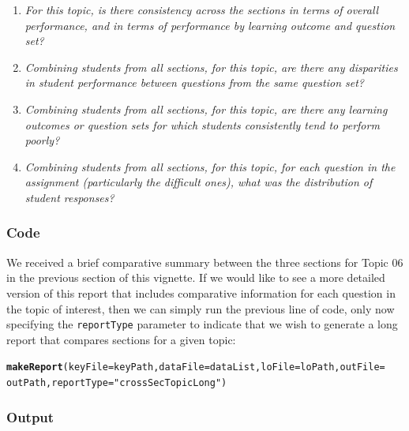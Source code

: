 \documentclass{article}\usepackage[]{graphicx}\usepackage[]{color}
\makeatletter
\newcommand{\hlstr}[1]{\textcolor[rgb]{0.192,0.494,0.8}{#1}}%
\newcommand{\hlstd}[1]{\textcolor[rgb]{0.345,0.345,0.345}{#1}}%
\newcommand{\hlkwc}[1]{\textcolor[rgb]{0.333,0.667,0.333}{#1}}%
\newcommand{\hlkwd}[1]{\textcolor[rgb]{0.737,0.353,0.396}{\textbf{#1}}}%
\newenvironment{kframe}{%
 \def\at@end@of@kframe{}%
 \ifinner\ifhmode%
  \def\at@end@of@kframe{\end{minipage}}%
  \begin{minipage}{\columnwidth}%
 \fi\fi%
 \def\FrameCommand##1{\hskip\@totalleftmargin \hskip-\fboxsep
 \colorbox{shadecolor}{##1}\hskip-\fboxsep
     \hskip-\linewidth \hskip-\@totalleftmargin \hskip\columnwidth}%
 \MakeFramed {\advance\hsize-\width
   \@totalleftmargin\z@ \linewidth\hsize
   \@setminipage}}%
 {\par\unskip\endMakeFramed%
 \at@end@of@kframe}
\newenvironment{knitrout}{}{} %
\numberwithin{equation}{section} %
\makeatother
\begin{document}
\begin{enumerate}
\item \textit{For this topic, is there consistency across the sections in terms of overall performance, and in terms of performance by learning outcome and question set?}
\item \textit{Combining students from all sections, for this topic, are there any disparities in student performance between questions from the same question set?}
\item \textit{Combining students from all sections, for this topic, are there any learning outcomes or question sets for which students consistently tend to perform poorly?}
\item \textit{Combining students from all sections, for this topic, for each question in the assignment (particularly the difficult ones), what was the distribution of student responses?}
\end{enumerate}

\subsubsection{Code}

We received a brief comparative summary between the three sections for Topic 06 in the previous section of this vignette. If we would like to see a more detailed version of this report that includes comparative information for each question in the topic of interest, then we can simply run the previous line of code, only now specifying the \texttt{reportType} parameter to indicate that we wish to generate a long report that compares sections for a given topic:

\begin{knitrout}
\color{fgcolor}\begin{kframe}
\begin{alltt}
\hlkwd{makeReport}\hlstd{(}\hlkwc{keyFile} \hlstd{= keyPath,} \hlkwc{dataFile} \hlstd{= dataList,} \hlkwc{loFile} \hlstd{= loPath,} \hlkwc{outFile} \hlstd{=}
  \hlstd{outPath,} \hlkwc{reportType} \hlstd{=} \hlstr{"crossSecTopicLong"}\hlstd{)}
\end{alltt}
\end{kframe}
\end{knitrout}

\subsubsection{Output}
\end{document}
